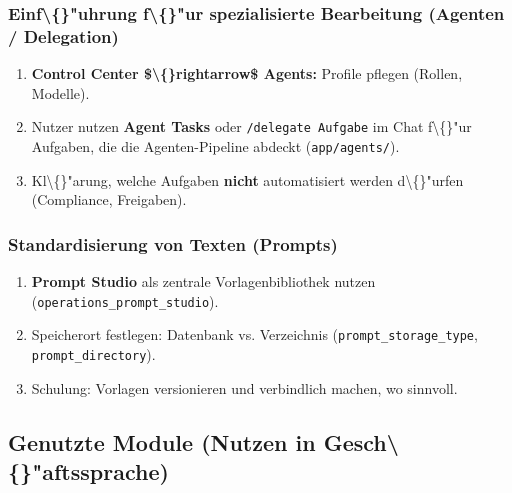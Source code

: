 \subsubsection{Einf\textbackslash\{\}"uhrung f\textbackslash\{\}"ur spezialisierte Bearbeitung (Agenten / Delegation)}

\begin{enumerate}
\item \textbf{Control Center \$\textbackslash\{\}rightarrow\$ Agents:} Profile pflegen (Rollen, Modelle).
\item Nutzer nutzen \textbf{Agent Tasks} oder \texttt{/delegate Aufgabe} im Chat f\textbackslash\{\}"ur Aufgaben, die die Agenten-Pipeline abdeckt (\texttt{app/agents/}).
\item Kl\textbackslash\{\}"arung, welche Aufgaben \textbf{nicht} automatisiert werden d\textbackslash\{\}"urfen (Compliance, Freigaben).
\end{enumerate}

\subsubsection{Standardisierung von Texten (Prompts)}

\begin{enumerate}
\item \textbf{Prompt Studio} als zentrale Vorlagenbibliothek nutzen (\texttt{operations\_prompt\_studio}).
\item Speicherort festlegen: Datenbank vs. Verzeichnis (\texttt{prompt\_storage\_type}, \texttt{prompt\_directory}).
\item Schulung: Vorlagen versionieren und verbindlich machen, wo sinnvoll.
\end{enumerate}

\subsection{Genutzte Module (Nutzen in Gesch\textbackslash\{\}"aftssprache)}

